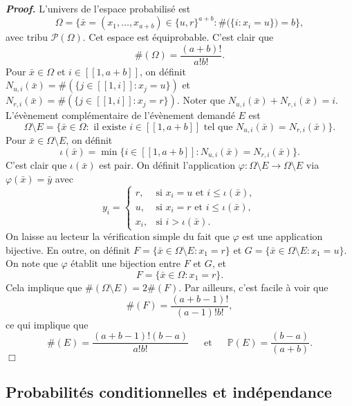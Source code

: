 \documentclass[11pt,a4paper]{article}
\newenvironment{preuve}[1][]
{\vskip 2mm  \noindent\emph{\bf Proof#1. }}{$\Box$ \vskip 2mm}
\let\leq\leqslant
\begin{document}
		\begin{preuve} 
			L'univers de l'espace probabilisé est 
			\[     \Omega = \Big\{ \bar{x} = (x_{1},\dots,x_{a+b}) \in \{ u , r \}^{a+b} : \#\big(\{ i : x_{i} = u \}\big) = b \Big\},     \]
			avec tribu $\mathscr{P}(\Omega)$. 
			Cet espace est équiprobable. 
			C'est clair que 
			\[     \#(\Omega) = \frac{(a+b)!}{a! b!}.     \] 
			Pour $\bar{x} \in \Omega$ et $i \in [\![ 1,a+b ]\!]$, on définit $N_{u,i}(\bar{x}) = \#(\{ j \in [\![ 1,i ]\!] : x_{j} = u \})$ 
			et $N_{r,i}(\bar{x}) = \#(\{ j \in [\![ 1,i ]\!] : x_{j} = r \})$. 
			Noter que $N_{u,i}(\bar{x}) + N_{r,i}(\bar{x})  = i$.
			L'évènement complémentaire de l'évènement demandé $E$ est 
			\[     \Omega \setminus E = \Big\{ \bar{x} \in \Omega : \text{ il existe } i \in [\![ 1,a+b ]\!] \text{ tel que }  N_{u,i}(\bar{x}) = N_{r,i}(\bar{x})  \Big\}.     \]
			Pour $\bar{x} \in \Omega \setminus E$, on définit 
			\[     \iota(\bar{x}) = \operatorname{min}\Big\{ i \in [\![ 1,a+b ]\!] : N_{u,i}(\bar{x}) = N_{r,i}(\bar{x})  \Big\}.     \]
			C'est clair que $\iota(\bar{x})$ est pair. 
			On définit l'application $\varphi : \Omega \setminus E \rightarrow \Omega \setminus E$ via $\varphi(\bar{x}) = \bar{y}$ avec 
			\[     y_{i} = \begin{cases} 
			r, &\text{si $x_{i} = u$ et $i \leq \iota(\bar{x})$},
			\\
			u, &\text{si $x_{i} = r$ et $i \leq \iota(\bar{x})$},
			\\
			x_{i}, &\text{si $i > \iota(\bar{x})$}.
			\end{cases}
			\]
			On laisse au lecteur la vérification simple du fait que $\varphi$ est une application bijective. 
			En outre, on définit $F = \{ \bar{x} \in \Omega \setminus E : x_{1} = r \}$ et $G = \{ \bar{x} \in \Omega \setminus E : x_{1} = u \}$. 
			On note que $\varphi$ établit une bijection entre $F$ et $G$, et 
			\[      F = \Big\{ \bar{x} \in \Omega : x_{1} = r  \Big\}.     \]
			Cela implique que $\#(\Omega \setminus E) = 2 \#(F)$. 
			Par ailleurs, c'est facile à voir que 
			\[     \#(F) = \frac{(a+b-1)!}{(a-1)! b!},     \]
			ce qui implique que 
			\[     \#(E) = \frac{(a+b-1)! (b-a)}{a! b!} \text{ $\phantom{x}$ et $\phantom{x}$  } \mathbb{P}(E) = \frac{(b-a)}{(a+b)}.     \]
		\end{preuve}
		
		\subsection{Probabilités conditionnelles et indépendance}
		
\end{document}
